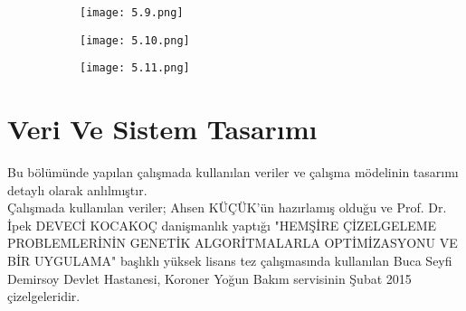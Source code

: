 \documentclass[12pt, a4paper]{article}
\begin{document}
\begin{flushleft}
\begin{enumerate}
\begin{itemize}
	\end{itemize}
	
	
	
	\begin{figure}[htbp]
		\centering
		\begin{subfigure}[b]{0.8\textwidth}
			\centering
			\texttt{[image: 5.9.png]}
			
			\label{fig:resim1}
		\end{subfigure}
		\hfill
		\begin{subfigure}[b]{0.8\textwidth}
			\centering
			\texttt{[image: 5.10.png]}
			
			\label{fig:resim1}
		\end{subfigure}
		\hfill
		\begin{subfigure}[b]{0.8\textwidth}
			\centering
			\texttt{[image: 5.11.png]}
			
			\label{fig:resim2}
		\end{subfigure}
		
		\label{fig:iki_resim}
	\end{figure}
	
	
	\clearpage
\end{enumerate}











\section{ Veri Ve Sistem Tasarımı}
    Bu bölümünde yapılan çalışmada kullanılan veriler ve çalışma mödelinin tasarımı detaylı olarak anlılmıştır. \\
	Çalışmada  kullanılan veriler; Ahsen KÜÇÜK'ün  hazırlamış olduğu ve Prof. Dr. İpek DEVECİ KOCAKOÇ danişmanlık yaptığı  "HEMŞİRE ÇİZELGELEME PROBLEMLERİNİN GENETİK ALGORİTMALARLA OPTİMİZASYONU VE BİR UYGULAMA" başlıklı yüksek lisans tez çalışmasında kullanılan Buca Seyfi Demirsoy Devlet Hastanesi, Koroner Yoğun Bakım servisinin Şubat 2015 çizelgeleridir.\cite{kuccuk2021hemcsire}
	\\[40pt]








\end{flushleft}
\end{document}
